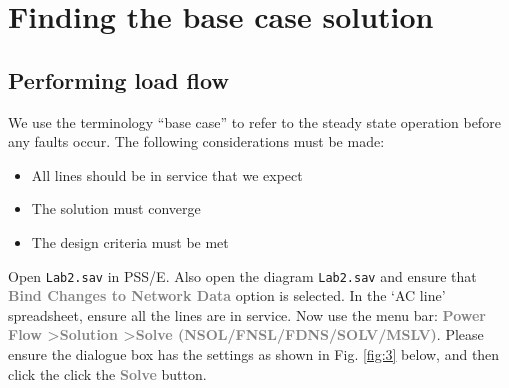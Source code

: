 \documentclass[paper=a4, fontsize=11pt]{article}
\begin{document}
\section{Finding the base case solution}
\subsection{Performing load flow}
We use the terminology ``base case'' to refer to the steady state operation before any faults occur. The following considerations must be made:
\begin{itemize}
\item{All lines should be in service that we expect}
\item{The solution must converge}
\item{The design criteria must be met}
\end{itemize}

Open \texttt{Lab2.sav} in PSS/E. Also open the diagram \texttt{Lab2.sav} and ensure that \textbf{\textcolor{gray}{Bind Changes to Network Data}} option is selected. In the `AC line' spreadsheet, ensure all the lines are in service. Now use the menu bar: \textbf{\textcolor{gray}{Power Flow \textgreater \phantom{ }Solution \textgreater \phantom{ }Solve (NSOL/FNSL/FDNS/SOLV/MSLV)}}. Please ensure the dialogue box has the settings as shown in Fig. \ref{fig:3} below, and then click the click the \textbf{\textcolor{gray}{Solve}} button.
\end{document}
